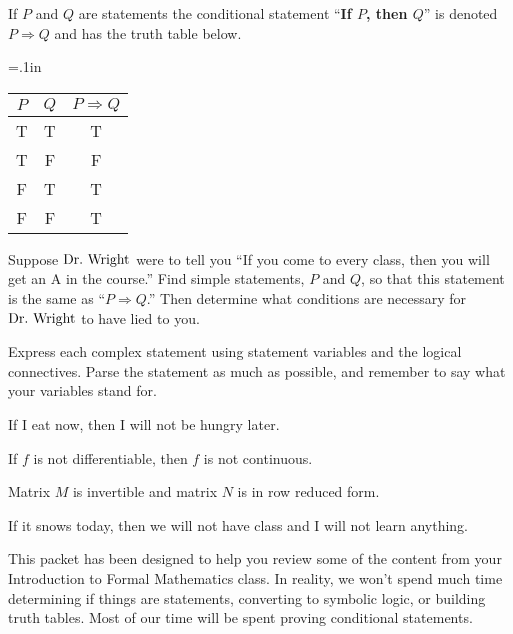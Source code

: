 \begin{definition}  If $P$ and $Q$ are statements the conditional statement ``\textbf{If $P$, then $Q$}'' is denoted $P \Rightarrow Q$ and has the truth table below.
	\begin{center}
	{\tabulinesep=.1in
	\begin{tabu}{|cc|c|}
	\hline
	$P$ & $Q$ & $ P \Rightarrow Q$ \\
	\hline
	T & T & T\\
	T & F & F\\
	F & T & T\\
	F & F & T\\
	\hline
	\end{tabu}}
	\end{center}
\end{definition}
\newpage
\begin{question}[resume]
\item Suppose $\text{Dr.~Wright}$ were to tell you ``If you come to every class, then you will get an A in the course.''  Find simple statements, $P$ and $Q$, so that this statement is the same as ``$P \Rightarrow Q$.'' Then determine what conditions are necessary for $\text{Dr.~Wright}$ to have lied to you.

\vspace{2in}

\item Express each complex statement using statement variables and the logical connectives.  Parse the statement as much as possible, and remember to say what your variables stand for.
	\begin{qpart}
	\item If I eat now, then I will not be hungry later.
	
	\vspace{1in}
	
	\item If $f$ is not differentiable, then $f$ is not continuous.
	
	\vspace{1in}
	
	\item Matrix $M$ is invertible and matrix $N$ is in row reduced form.
	
	\vspace{1in}
	
	\item If it snows today, then we will not have class and I will not learn anything.
	
	\vspace{1in}
	\end{qpart}
\end{question}

This packet has been designed to help you review some of the content from your Introduction to Formal Mathematics class.  In reality, we won't spend much time determining if things are statements, converting to symbolic logic, or building truth tables.  Most of our time will be spent proving conditional statements.    






